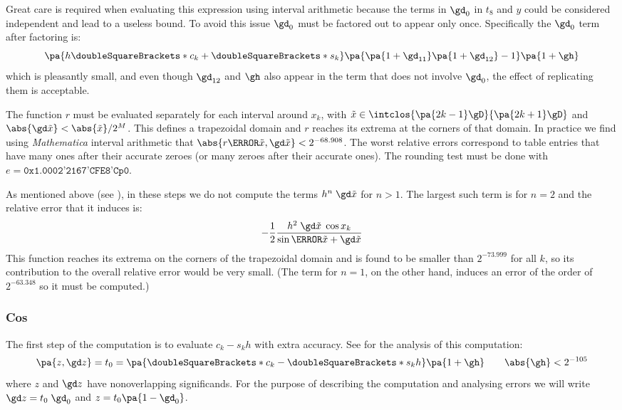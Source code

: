 \documentclass[10pt, a4paper, twoside]{basestyle}
\newcommand{\round}[1]{\doubleSquareBrackets*{#1}}
\newcommand{\red}[1]{\tilde{#1}}
\begin{document}
Great care is required when evaluating this expression using interval arithmetic because the terms in $\gd_0$ in $t_8$ and $y$ could be considered independent and lead to a useless bound.  To avoid this issue $\gd_0$ must be factored out to appear only once.  Specifically the $\gd_0$ term after factoring is:
\[
\pa{h \round{c_k} + \round{s_k}} \pa{\pa{1 + \gd_{11}} \pa{1 + \gd_{12}} - 1} \pa{1 + \gh}
\]
which is pleasantly small, and even though $\gd_{12}$ and $\gh$ also appear in the term that does not involve $\gd_0$, the effect of replicating them is acceptable.

The function $r$ must be evaluated separately for each interval around $x_k$, with $\red x \in \intclos{\pa{2 k - 1}\gD}{\pa{2 k + 1}\gD}$ and $\abs{\gd \red x} < {\abs{\red x}} / 2^M$.  This defines a trapezoidal domain and $r$ reaches its extrema at the corners of that domain.  In practice we find using \textit{Mathematica} interval arithmetic that $\abs{r\of{\red x, \gd \red x}} < 2^{-68.908}$.  The worst relative errors correspond to table entries that have many ones after their accurate zeroes (or many zeroes after their accurate ones).  The rounding test must be done with $e = \texttt{0x1.0002'2167'CFE8'Cp0}$.

As mentioned above (see ), in these steps we do not compute the terms $h^n \; \gd \red x$ for $n > 1$.  The largest such term is for $n = 2$ and the relative error that it induces is:
\[
-\frac{1}{2}\frac{h^2 \; \gd \red x \; \cos x_k}{\sin\of{\red x + \gd \red x}}
\]
This function reaches its extrema on the corners of the trapezoidal domain and is found to be smaller than $2^{-73.999}$ for all $k$, so its contribution to the overall relative error would be very small.  (The term for $n = 1$, on the other hand, induces an error of the order of $2^{-63.348}$ so it must be computed.)

\subsubsection*{Cos}\label{secerroranalysiscos}

The first step of the computation is to evaluate $c_k - s_k h$ with extra accuracy.  See  for the analysis of this computation:
\[
\pa{z, \gd z} = t_0 = \pa{\round{c_k} - \round{s_k} h} \pa{1 + \gh} \qquad \abs{\gh} < 2^{-105}
\]
where $z$ and $\gd z$ have nonoverlapping significands.  For the purpose of describing the computation and analysing errors we will write $\gd z = t_0 \; \gd_0$ and $z = t_0 \pa{1 - \gd_0}$.
\end{document}
